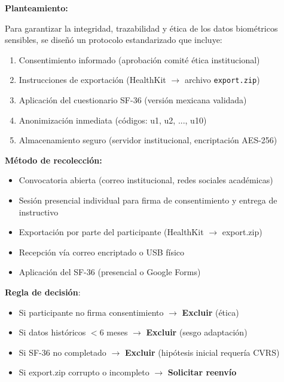 \documentclass[12pt,letterpaper,twoside]{report}
\begin{document}
\begin{hipotesisbox}
\textbf{Planteamiento:}

Para garantizar la integridad, trazabilidad y ética de los datos biométricos sensibles, se diseñó un protocolo estandarizado que incluye:
\begin{enumerate}[noitemsep]
    \item Consentimiento informado (aprobación comité ética institucional)
    \item Instrucciones de exportación (HealthKit $\to$ archivo \texttt{export.zip})
    \item Aplicación del cuestionario SF-36 (versión mexicana validada)
    \item Anonimización inmediata (códigos: u1, u2, ..., u10)
    \item Almacenamiento seguro (servidor institucional, encriptación AES-256)
\end{enumerate}
\end{hipotesisbox}

\begin{estadisticobox}
\textbf{Método de recolección:}

\begin{itemize}[noitemsep]
    \item Convocatoria abierta (correo institucional, redes sociales académicas)
    \item Sesión presencial individual para firma de consentimiento y entrega de instructivo
    \item Exportación por parte del participante (HealthKit $\to$ export.zip)
    \item Recepción vía correo encriptado o USB físico
    \item Aplicación del SF-36 (presencial o Google Forms)
\end{itemize}
\end{estadisticobox}

\begin{reglabox}
\textbf{Regla de decisión}:

\begin{itemize}[noitemsep]
    \item Si participante no firma consentimiento $\to$ \textbf{Excluir} (ética)
    \item Si datos históricos $< 6$ meses $\to$ \textbf{Excluir} (sesgo adaptación)
    \item Si SF-36 no completado $\to$ \textbf{Excluir} (hipótesis inicial requería CVRS)
    \item Si export.zip corrupto o incompleto $\to$ \textbf{Solicitar reenvío}
\end{itemize}
\end{reglabox}
\end{document}
